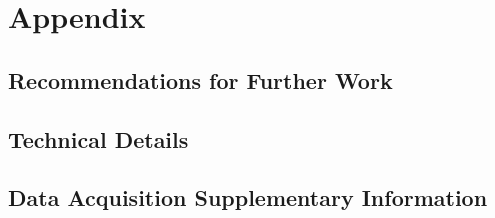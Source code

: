 \chapter{Appendix}

\section{Recommendations for Further Work}

\newpage
\section{Technical Details}

\newpage
\section{Data Acquisition Supplementary Information}
